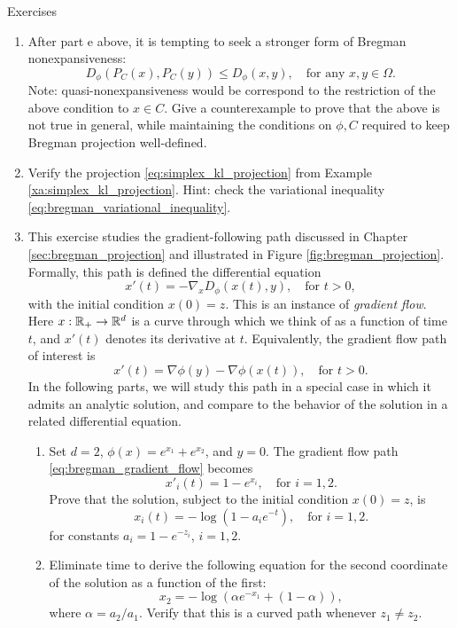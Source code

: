 \begin{xcb}{Exercises}
\begin{enumerate}[label=\thechapter.\arabic*]
\item After part e above, it is tempting to seek a stronger form of Bregman
  nonexpansiveness:   
  \[
  D_\phi(P_C(x),P_C(y)) \leq D_\phi(x,y), \quad \text{for any $x,y \in \Omega$}.   
  \]
  Note: quasi-nonexpansiveness would be correspond to the restriction of
  the above condition to $x \in C$. Give a counterexample to prove that the
  above is not true in general, while maintaining the conditions on $\phi,C$
  required to keep Bregman projection well-defined.  

\item \label{ex:kullback_leibler_projection}
  Verify the projection \eqref{eq:simplex_kl_projection} from Example
  \ref{xa:simplex_kl_projection}. Hint: check the variational inequality
  \eqref{eq:bregman_variational_inequality}.   

\item \label{ex:bregman_gradient_flow}
  This exercise studies the gradient-following path discussed in Chapter
  \ref{sec:bregman_projection} and illustrated in Figure
  \ref{fig:bregman_projection}. Formally, this path is defined the differential 
  equation   
  \[
  x'(t) = - \nabla_x D_\phi(x(t),y), \quad \text{for $t > 0$}, 
  \]
  with the initial condition $x(0) = z$. This is an instance of \emph{gradient 
    flow}. Here $x : \mathbb{R}_+ \to \mathbb{R}^d$ is a curve through which we think of as a
  function of time $t$, and $x'(t)$ denotes its derivative at $t$. Equivalently,
  the gradient flow path of interest is   
  \begin{equation}
  \label{eq:bregman_gradient_flow}
  x'(t) = \nabla\phi(y) - \nabla\phi(x(t)), \quad \text{for $t > 0$}.
  \end{equation}
  In the following parts, we will study this path in a special case in which it
  admits an analytic solution, and compare to the behavior of the solution in a
  related differential equation.  
  
\begin{enumerate}[label=\alph*.]
\item Set $d=2$, $\phi(x) = e^{x_1} + e^{x_2}$, and $y=0$. The gradient flow
  path \eqref{eq:bregman_gradient_flow} becomes 
  \[
  x'_i(t) = 1 - e^{x_i}, \quad \text{for $i=1,2$}.
  \]
  Prove that the solution, subject to the initial condition $x(0) = z$, is 
  \[
  x_i(t) = -\log(1 - a_i e^{-t}), \quad \text{for $i=1,2$}.
  \]
  for constants $a_i = 1-e^{-z_i}$, $i=1,2$. 

\item Eliminate time to derive the following equation for the second coordinate
  of the solution as a function of the first: 
  \[
  x_2 = -\log(\alpha e^{-x_1} + (1-\alpha)),
  \]
  where $\alpha = a_2/a_1$. Verify that this is a curved path whenever $z_1
  \not= z_2$.  


\end{enumerate}
\end{enumerate}
\end{xcb}
